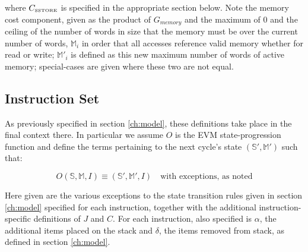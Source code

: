 \documentclass[9pt,oneside]{amsart}
\begin{document}
where $C_\text{\tiny SSTORE}$ is specified in the appropriate section below. Note the memory cost component, given as the product of $G_{memory}$ and the maximum of 0 and the ceiling of the number of words in size that the memory must be over the current number of words, $\mathbb{M}_i$ in order that all accesses reference valid memory whether for read or write; $\mathbb{M}'_i$ is defined as this new maximum number of words of active memory; special-cases are given where these two are not equal.

\subsection{Instruction Set}

As previously specified in section \ref{ch:model}, these definitions take place in the final context there. In particular we assume $O$ is the EVM state-progression function and define the terms pertaining to the next cycle's state $(\mathbb{S}', \mathbb{M}')$ such that:

\begin{equation}
O(\mathbb{S}, \mathbb{M}, I) \equiv (\mathbb{S}', \mathbb{M}', I) \quad \text{with exceptions, as noted}
\end{equation}

Here given are the various exceptions to the state transition rules given in section \ref{ch:model} specified for each instruction, together with the additional instruction-specific definitions of $J$ and $C$. For each instruction, also specified is $\alpha$, the additional items placed on the stack and $\delta$, the items removed from stack, as defined in section \ref{ch:model}.
\end{document}
